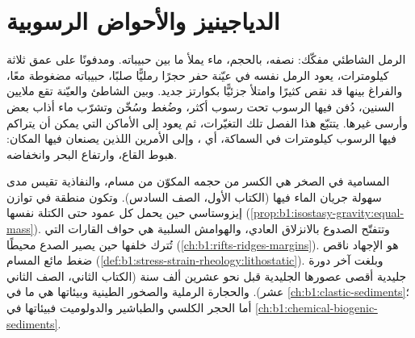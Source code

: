 \chapter{الدياجينيز والأحواض الرسوبية}\label{ch:b1:diagenesis-basins}

الرمل الشاطئي مفكّك: نصفه، بالحجم، ماء يملأ ما بين حبيباته. ومدفونًا على عمق ثلاثة كيلومترات، يعود الرمل نفسه في عيّنة حفر حجرًا رمليًّا صلبًا، حبيباته مضغوطة معًا، والفراغ بينها قد نقص كثيرًا وامتلأ جزئيًّا بكوارتز جديد. وبين الشاطئ والعيّنة تقع ملايين السنين، دُفن فيها الرسوب تحت رسوب أكثر، وضُغط وسُخّن وتشرّب ماء أذاب بعض  وأرسى غيرها. يتتبّع هذا الفصل تلك التغيّرات، ثم يعود إلى الأماكن التي يمكن أن يتراكم فيها الرسوب كيلومترات في السماكة، أي ، وإلى الأمرين اللذين يصنعان فيها المكان: هبوط القاع، وارتفاع البحر وانخفاضه.

\begin{recall}
المسامية في الصخر هي الكسر من حجمه المكوّن من مسام، والنفاذية تقيس مدى سهولة جريان الماء فيها (الكتاب الأول، الصف السادس). وتكون منطقة في توازن إيزوستاسي حين يحمل كل عمود حتى  الكتلة نفسها (\cref{prop:b1:isostasy-gravity:equal-mass}). وتتفتّح الصدوع بالانزلاق العادي، والهوامش السلبية هي حواف القارات التي تُترك خلفها حين يصير الصدع محيطًا (\cref{ch:b1:rifts-ridges-margins}).  هو الإجهاد ناقص ضغط مائع المسام (\cref{def:b1:stress-strain-rheology:lithostatic}). وبلغت آخر دورة جليدية أقصى عصورها الجليدية قبل نحو عشرين ألف سنة (الكتاب الثاني، الصف الثاني عشر). والحجارة الرملية والصخور الطينية وبيئاتها هي ما في \cref{ch:b1:clastic-sediments}؛ أما الحجر الكلسي والطباشير والدولوميت  فبيئاتها في \cref{ch:b1:chemical-biogenic-sediments}.
\end{recall}

